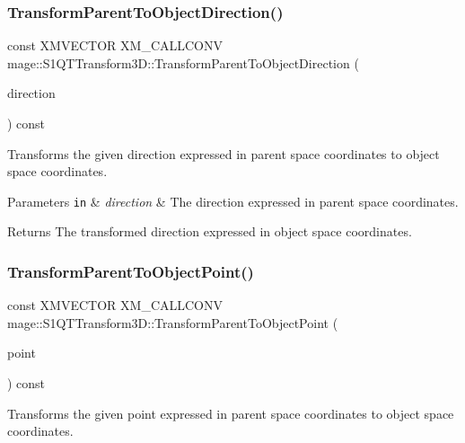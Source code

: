 \subsubsection{\texorpdfstring{Transform\+Parent\+To\+Object\+Direction()}{TransformParentToObjectDirection()}}
{\footnotesize\ttfamily const X\+M\+V\+E\+C\+T\+OR X\+M\+\_\+\+C\+A\+L\+L\+C\+O\+NV mage\+::\+S1\+Q\+T\+Transform3\+D\+::\+Transform\+Parent\+To\+Object\+Direction (\begin{DoxyParamCaption}\item[{F\+X\+M\+V\+E\+C\+T\+OR}]{direction }\end{DoxyParamCaption}) const\hspace{0.3cm}{\ttfamily [noexcept]}}

Transforms the given direction expressed in parent space coordinates to object space coordinates.


\begin{DoxyParams}[1]{Parameters}
\mbox{\tt in}  & {\em direction} & The direction expressed in parent space coordinates. \\
\hline
\end{DoxyParams}
\begin{DoxyReturn}{Returns}
The transformed direction expressed in object space coordinates. 
\end{DoxyReturn}
\mbox{\label{classmage_1_1_s1_q_t_transform3_d_a3219ed3a7f86669081239d26d677b668}} 
\subsubsection{\texorpdfstring{Transform\+Parent\+To\+Object\+Point()}{TransformParentToObjectPoint()}}
{\footnotesize\ttfamily const X\+M\+V\+E\+C\+T\+OR X\+M\+\_\+\+C\+A\+L\+L\+C\+O\+NV mage\+::\+S1\+Q\+T\+Transform3\+D\+::\+Transform\+Parent\+To\+Object\+Point (\begin{DoxyParamCaption}\item[{F\+X\+M\+V\+E\+C\+T\+OR}]{point }\end{DoxyParamCaption}) const\hspace{0.3cm}{\ttfamily [noexcept]}}

Transforms the given point expressed in parent space coordinates to object space coordinates.


